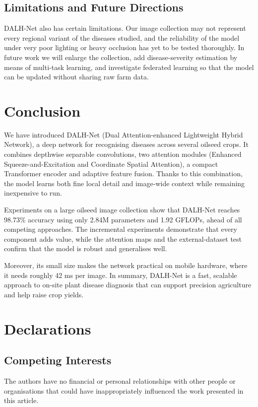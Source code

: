 \documentclass[default, iicol]{sn-jnl}
\theoremstyle{thmstyleone}%
\theoremstyle{thmstyletwo}%
\theoremstyle{thmstylethree}%
\begin{document}
\subsection{Limitations and Future Directions}

DALH-Net also has certain limitations. Our image collection may not represent every regional variant of the diseases studied, and the reliability of the model under very poor lighting or heavy occlusion has yet to be tested thoroughly. In future work we will enlarge the collection, add disease-severity estimation by means of multi-task learning, and investigate federated learning so that the model can be updated without sharing raw farm data.

\section{Conclusion}\label{sec:conclusion}
We have introduced DALH-Net (Dual Attention-enhanced Lightweight Hybrid Network), a deep network for recognising diseases across several oilseed crops. It combines depthwise separable convolutions, two attention modules (Enhanced Squeeze-and-Excitation and Coordinate Spatial Attention), a compact Transformer encoder and adaptive feature fusion. Thanks to this combination, the model learns both fine local detail and image-wide context while remaining inexpensive to run.

Experiments on a large oilseed image collection show that DALH-Net reaches 98.73\% accuracy using only 2.84M parameters and 1.92 GFLOPs, ahead of all competing approaches. The incremental experiments demonstrate that every component adds value, while the attention maps and the external-dataset test confirm that the model is robust and generalises well.

Moreover, its small size makes the network practical on mobile hardware, where it needs roughly 42 ms per image. In summary, DALH-Net is a fast, scalable approach to on-site plant disease diagnosis that can support precision agriculture and help raise crop yields.

\section*{Declarations}
\subsection{Competing Interests}
The authors have no financial or personal relationships with other people or organisations that could have inappropriately influenced the work presented in this article.
\end{document}
